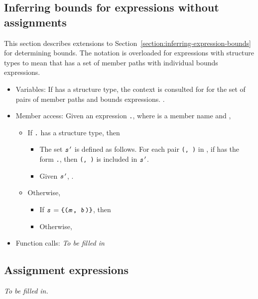 \subsection{Inferring bounds for expressions without assignments}

This section describes extensions to Section~\ref{section:inferring-expression-bounds} for
determining bounds.   The notation  is overloaded for expressions
with structure types to mean that  has a set of member paths with individual bounds expressions.
\begin{itemize}
\item Variables: If  has a structure type, the context is consulted for  for
the set  of pairs of member paths and bounds expressions.  .
\item Member access: Given an expression \texttt{.}, where  is 
a member name and ,
\begin{itemize}
\item If \texttt{.} has a structure type, then
\begin{itemize}
\item The set $\texttt{\textit{s}}^{\prime}$ is defined as follows.  For each pair 
      \texttt{(, )} in , if  has the form 
      \texttt{.}, then \texttt{(, )} is
      included in $\texttt{\textit{s}}^\prime$.
\item  Given $\texttt{\textit{s}}^\prime$, .
\end{itemize}
\item Otherwise,
\begin{itemize}
\item If $\texttt{\textit{s}} = \texttt{\{(\texttt{\textit{m}}, \texttt{\textit{b}})\}}$, then 
\item Otherwise, 
\end{itemize}
\end{itemize}
\item Function calls: {\em To be filled in}
\end{itemize}

\subsection{Assignment expressions}

{\em To be filled in.}
